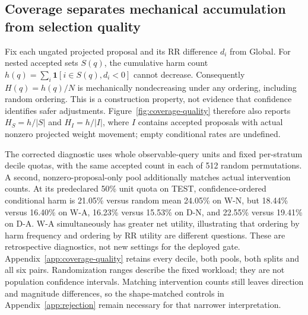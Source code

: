 \documentclass[11pt,a4paper]{article}
\begin{document}
\subsection{Coverage separates mechanical accumulation from selection quality}
\label{sec:coverage-quality}
Fix each ungated projected proposal and its RR difference $d_i$ from Global. For nested accepted sets $S(q)$, the cumulative harm count $h(q)=\sum_i\mathbf{1}[i\in S(q),d_i<0]$ cannot decrease. Consequently $H(q)=h(q)/N$ is mechanically nondecreasing under any ordering, including random ordering. This is a construction property, not evidence that confidence identifies safer adjustments. Figure~\ref{fig:coverage-quality} therefore also reports $H_S=h/|S|$ and $H_I=h/|I|$, where $I$ contains accepted proposals with actual nonzero projected weight movement; empty conditional rates are undefined.

The corrected diagnostic uses whole observable-query units and fixed per-stratum decile quotas, with the same accepted count in each of 512 random permutations. A second, nonzero-proposal-only pool additionally matches actual intervention counts. At its predeclared 50\% unit quota on TEST, confidence-ordered conditional harm is 21.05\% versus random mean 24.05\% on W-N, but 18.44\% versus 16.40\% on W-A, 16.23\% versus 15.53\% on D-N, and 22.55\% versus 19.41\% on D-A. W-A simultaneously has greater net utility, illustrating that ordering by harm frequency and ordering by RR utility are different questions. These are retrospective diagnostics, not new settings for the deployed gate. Appendix~\ref{app:coverage-quality} retains every decile, both pools, both splits and all six pairs. Randomization ranges describe the fixed workload; they are not population confidence intervals. Matching intervention counts still leaves direction and magnitude differences, so the shape-matched controls in Appendix~\ref{app:rejection} remain necessary for that narrower interpretation.
\end{document}
